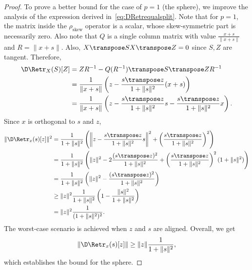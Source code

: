 \begin{proof}
To prove a better bound for the case of $p=1$ (the sphere), we improve the analysis of the expression derived in~\eqref{eq:DRetrequalsplit}. Note that for $p = 1$, the matrix inside the $\rho_{\mathrm{skew}}$ operator is a scalar, whose skew-symmetric part is necessarily zero. Also note that $Q$ is a single column matrix with value $\frac{x + s}{\|x + s\|}$ and $R = \|x + s\|$. Also, $X\transpose S X\transpose Z = 0$ since $S,Z$ are tangent. Therefore,
\begin{align*}
	\D\Retr_X(S)[Z] & = Z R^{-1} - Q(R^{-1})\transpose S\transpose Z R^{-1} \\
	 				& = \frac{1}{\|x+s\|} \left(z - \frac{s\transpose z}{1+\|s\|^2}(x+s)\right) \\
	 				& = \frac{1}{\|x+s\|} \left(z - \frac{s\transpose z}{1+\|s\|^2} s - \frac{s\transpose z}{1+\|s\|^2} x\right).
\end{align*}
Since $x$ is orthogonal to $s$ and $z$,
\begin{align*}
	\|\D\Retr_x(s)[z]\|^2 & = \frac{1}{1+\|s\|^2} \left( \left\|z - \frac{s\transpose z}{1+\|s\|^2} s \right\|^2 + \left( \frac{s\transpose z}{1+\|s\|^2}\right)^2 \right) \\
					   	    & = \frac{1}{1+\|s\|^2} \left( \|z\|^2 - 2\frac{(s\transpose z)^2}{1+\|s\|^2}  + \left( \frac{s\transpose z}{1+\|s\|^2}\right)^2 (1 + \|s\|^2) \right) \\
					   	    & = \frac{1}{1+\|s\|^2} \left( \|z\|^2 - \frac{(s\transpose z)^2}{1+\|s\|^2}\right) \\
					   	    & \geq \|z\|^2 \frac{1}{1+\|s\|^2} \left( 1 - \frac{\|s\|^2}{1+\|s\|^2} \right) \\
					   	    & = \|z\|^2 \frac{1}{(1+\|s\|^2)^2}.
\end{align*}
The worst-case scenario is achieved when $z$ and $s$ are aligned. Overall, we get
\[
	\|\D\Retr_x(s)[z]\| \geq \|z\| \frac{1}{1+\|s\|^2},
\]
which establishes the bound for the sphere. 
\end{proof}

